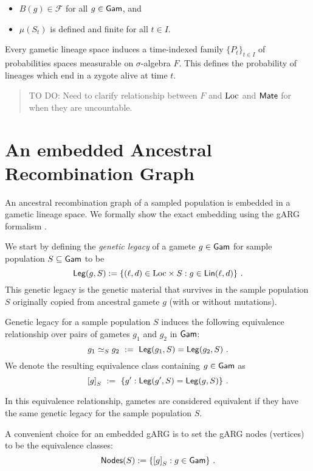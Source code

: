 \documentclass{article}
\begin{document}
\begin{itemize}
\item
  \(B(g) \in \mathcal{F}\) for all \(g \in \mathsf{Gam}\), and
\item
  \(\mu(S_t)\) is defined and finite for all \(t \in I\).
\end{itemize}

Every gametic lineage space induces a time-indexed family
\(\{P_t\}_{t \in I}\) of probabilities spaces measurable on
\(\sigma\)-algebra \(F\). This defines the probability of lineages which
end in a zygote alive at time \(t\).

\begin{quote}
TO DO: Need to clarify relationship between \(F\) and \(\mathrm{Loc}\) and
\(\mathsf{Mate}\) for when they are uncountable.
\end{quote}

\section{An embedded Ancestral Recombination Graph}

An ancestral recombination graph \cite{friedman_ancestral_1997}
\cite{hein_gene_2005} \cite{wakeley_coalescent_2009} of a sampled
population is embedded in a gametic lineage space. We formally show the
exact embedding using the gARG formalism \cite{wong_what_arg_2022}.

We start by defining the \emph{genetic legacy} of a gamete
\(g \in \mathsf{Gam}\) for sample population \(S \subseteq \mathsf{Gam}\) to be \[
  \mathsf{Leg}(g, S) := \{ (\ell, d) \in \mathrm{Loc} \times S : g \in \mathsf{Lin}(\ell, d) \}
\text{ .}
\] This genetic legacy is the genetic material that survives in the
sample population \(S\) originally copied from ancestral gamete \(g\)
(with or without mutations).

Genetic legacy for a sample population \(S\) induces the following
equivalence relationship over pairs of gametes \(g_1\) and \(g_2\) in
\(\mathsf{Gam}\): \[
g_1 \simeq_S g_2 \ := \ \mathsf{Leg}(g_1, S) = \mathsf{Leg}(g_2, S)
\text{ .}
\] We denote the resulting equivalence class containing \(g \in \mathsf{Gam}\)
as \[
{[g]}_S \ := \ \{ g' : \mathsf{Leg}(g', S) = \mathsf{Leg}(g, S) \}
\text{ .}
\]

In this equivalence relationship, gametes are considered equivalent if
they have the same genetic legacy for the sample population \(S\).

A convenient choice for an embedded gARG \cite{wong_what_arg_2022} is
to set the gARG nodes (vertices) to be the equivalence classes: \[
   \mathsf{Nodes}(S) := \{ {[g]}_S : g \in \mathsf{Gam} \}
\text{ .}
\]
\end{document}
